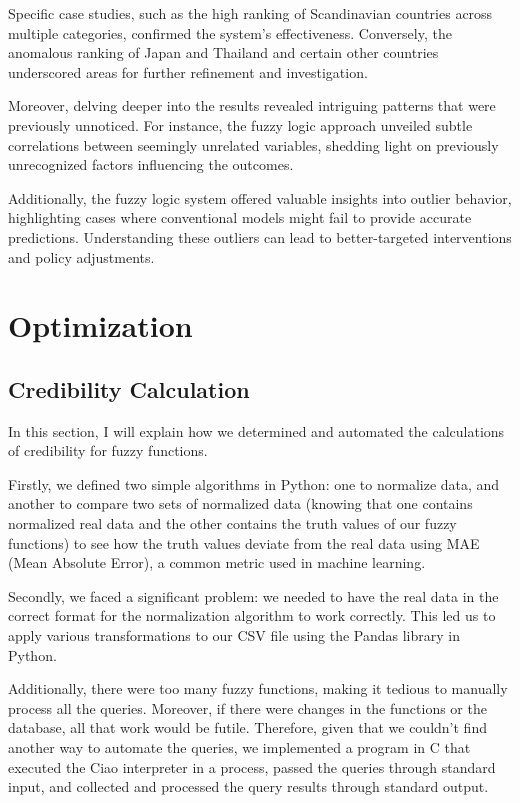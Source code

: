 \documentclass[fleqn,11pt]{article}
\begin{document}
Specific case studies, such as the high ranking of Scandinavian countries across multiple categories, confirmed the system's effectiveness. Conversely, the anomalous ranking of Japan and Thailand and certain other countries underscored areas for further refinement and investigation.

Moreover, delving deeper into the results revealed intriguing patterns that were previously unnoticed. For instance, the fuzzy logic approach unveiled subtle correlations between seemingly unrelated variables, shedding light on previously unrecognized factors influencing the outcomes.

Additionally, the fuzzy logic system offered valuable insights into outlier behavior, highlighting cases where conventional models might fail to provide accurate predictions. Understanding these outliers can lead to better-targeted interventions and policy adjustments.

\newpage
\section{Optimization}
\subsection{Credibility Calculation}

In this section, I will explain how we determined and automated the calculations of credibility for fuzzy functions.

Firstly, we defined two simple algorithms in Python: one to normalize data, and another to compare two sets of normalized data (knowing that one contains normalized real data and the other contains the truth values of our fuzzy functions) to see how the truth values deviate from the real data using MAE (Mean Absolute Error), a common metric used in machine learning.

Secondly, we faced a significant problem: we needed to have the real data in the correct format for the normalization algorithm to work correctly. This led us to apply various transformations to our CSV file using the Pandas library in Python.

Additionally, there were too many fuzzy functions, making it tedious to manually process all the queries. Moreover, if there were changes in the functions or the database, all that work would be futile. Therefore, given that we couldn't find another way to automate the queries, we implemented a program in C that executed the Ciao interpreter in a process, passed the queries through standard input, and collected and processed the query results through standard output.
\end{document}
